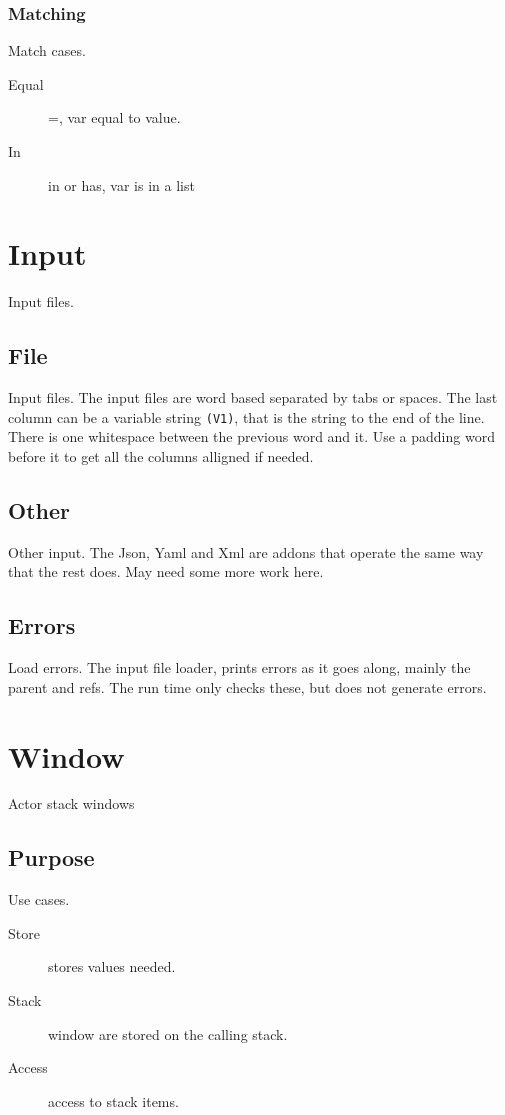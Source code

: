 \documentclass[11pt]{article}
\begin{document}
\subsubsection{Matching}
Match cases.
\begin{description}
\item[Equal]  =, var equal to value.
\item[In]  in or has, var is in a list 
\end{description}
\section{Input}
Input files.
\subsection{File}
Input files.
The input files are word based separated by tabs or spaces. The last
column can be a variable string \texttt{(V1)}, that is the string to the
end of the line. There is one whitespace between the previous word and
it. Use a padding word before it to get all the columns alligned if
needed.
\subsection{Other}
Other input.
The Json, Yaml and Xml are addons that operate the same way that the
rest does. May need some more work here.
\subsection{Errors}
Load errors.
The input file loader, prints errors as it goes along, mainly the parent
and refs. The run time only checks these, but does not generate errors.
\section{Window}
Actor stack windows
\subsection{Purpose}
Use cases.
\begin{description}
\item[Store]  stores values needed.
\item[Stack]  window are stored on the calling stack.
\item[Access]  access to stack items.
\end{description}
\end{document}
